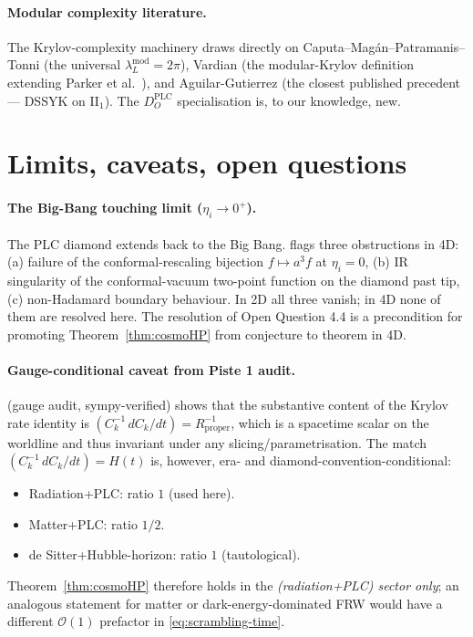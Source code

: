 \documentclass[11pt]{article}
\theoremstyle{definition}
\theoremstyle{remark}
\newcommand{\OO}{\mathcal{O}}
\newcommand{\PLC}{\mathrm{PLC}}
\begin{document}
\paragraph{Modular complexity literature.} The Krylov-complexity machinery
draws directly on Caputa--Mag\'an--Patramanis--Tonni \cite{CMPT24} (the
universal $\lambda_L^{\mathrm{mod}}=2\pi$), Vardian \cite{Vardian26} (the
modular-Krylov definition extending Parker et al.\ \cite{Parker19}), and
Aguilar-Gutierrez \cite{AguilarGutierrez25} (the closest published
precedent --- DSSYK on II$_1$). The $D_O^{\PLC}$ specialisation is, to our
knowledge, new.

\section{Limits, caveats, open questions}
\label{sec:limits}

\paragraph{The Big-Bang touching limit ($\eta_i\to 0^+$).} The PLC diamond
extends back to the Big Bang. \cite{frwnote} flags three obstructions in
4D: (a) failure of the conformal-rescaling bijection $f\mapsto a^3 f$ at
$\eta_i=0$, (b) IR singularity of the conformal-vacuum two-point function
on the diamond past tip, (c) non-Hadamard boundary behaviour. In 2D all
three vanish; in 4D none of them are resolved here. The resolution of
\cite{frwnote} Open Question 4.4 is a precondition for promoting
Theorem~\ref{thm:cosmoHP} from conjecture to theorem in 4D.

\paragraph{Gauge-conditional caveat from Piste 1 audit.}
\cite{piste1note} (gauge audit, sympy-verified) shows that the substantive
content of the Krylov rate identity is
$(C_k^{-1}\,dC_k/dt)=R_{\mathrm{proper}}^{-1}$, which is a
spacetime scalar on the worldline and thus invariant under any
slicing/parametrisation. The match
$(C_k^{-1}\,dC_k/dt)=H(t)$ is, however, era- and diamond-convention-conditional:
\begin{itemize}
  \item Radiation+PLC: ratio $1$ (used here).
  \item Matter+PLC: ratio $1/2$.
  \item de Sitter+Hubble-horizon: ratio $1$ (tautological).
\end{itemize}
Theorem~\ref{thm:cosmoHP} therefore holds in the \emph{(radiation+PLC)
sector only}; an analogous statement for matter or dark-energy-dominated
FRW would have a different $\OO(1)$ prefactor in
\eqref{eq:scrambling-time}.
\end{document}
